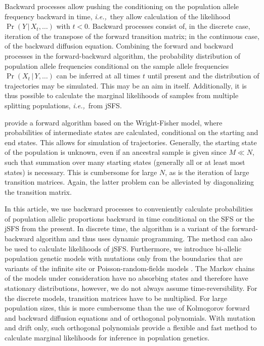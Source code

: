 \documentclass[preprint]{elsarticle}
\newcommand\given{{\,|\,}}
\newcommand\ie{{\it i.e.,}}
\begin{document}
Backward processes allow pushing the conditioning on the population allele frequency backward in time, \ie\ they allow calculation of the likelihood $\Pr(Y\given X_t, \dots)$ with $t<0$. Backward processes consist of, in the discrete case, iteration of the transpose of the forward transition matrix; in the continuous case, of the backward diffusion equation. Combining the forward and backward processes in the forward-backward algorithm, the probability distribution of population allele frequencies conditional on the sample allele frequencies $\Pr(X_t\given Y,\dots)$ can be inferred at all times $t$ until present and the distribution of trajectories may be simulated. This may be an aim in itself. Additionally, it is thus possible to calculate the marginal likelihoods of samples from multiple splitting populations, \ie\ from jSFS.

\citet{Zhao13} provide a forward algorithm based on the Wright-Fisher model, where probabilities of intermediate states are calculated, conditional on the starting and end states. This allows for simulation of trajectories. Generally, the starting state of the population is unknown, even if an ancestral sample is given since $M \ll N$, such that summation over many starting states (generally all or at least most states) is necessary. This is cumbersome for large $N$, as is the iteration of large transition matrices. Again, the latter problem can be alleviated by diagonalizing the transition matrix. 

In this article, we use backward processes to conveniently calculate probabilities of population allelic proportions backward in time conditional on the SFS or the jSFS from the present. In discrete time, the algorithm is a variant of the forward-backward algorithm and thus uses dynamic programming. The method can also be used to calculate likelihoods of jSFS. Furthermore, we introduce bi-allelic population genetic models with mutations only from the boundaries that are variants of the infinite site or Poisson-random-fields models \citep{Kimu69,Sawy92}. The Markov chains of the models under consideration have no absorbing states and therefore have stationary distributions, however, we do not always assume time-reversibility. For the discrete models, transition matrices have to be multiplied. For large population sizes, this is more cumbersome than the use of Kolmogorov forward and backward diffusion equations and of orthogonal polynomials. With mutation and drift only, such orthogonal polynomials provide a flexible and fast method to calculate marginal likelihoods for inference in population genetics.
\end{document}
